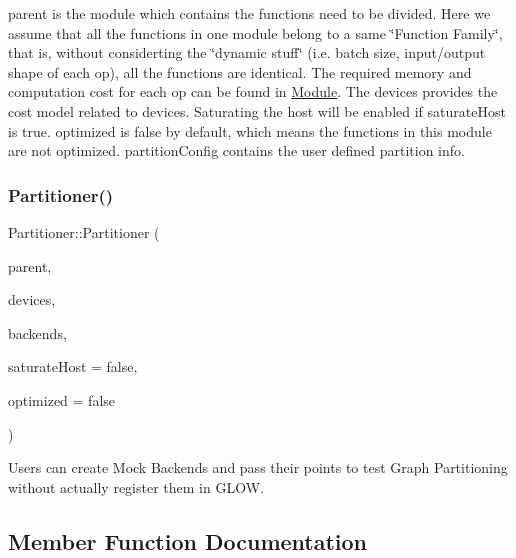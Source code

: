 {\ttfamily parent} is the module which contains the functions need to be divided. Here we assume that all the functions in one module belong to a same \char`\"{}\+Function Family\char`\"{}, that is, without considerting the \char`\"{}dynamic stuff\char`\"{} (i.\+e. batch size, input/output shape of each op), all the functions are identical. The required memory and computation cost for each op can be found in \hyperlink{classglow_1_1_module}{Module}. The {\ttfamily devices} provides the cost model related to devices. Saturating the host will be enabled if {\ttfamily saturate\+Host} is true. {\ttfamily optimized} is false by default, which means the functions in this module are not optimized. {\ttfamily partition\+Config} contains the user defined partition info. \mbox{\label{classglow_1_1_partitioner_a7de345d695b595b2ade385ee1cd82644}} 
\subsubsection{\texorpdfstring{Partitioner()}{Partitioner()}\hspace{0.1cm}{\footnotesize\ttfamily [2/2]}}
{\footnotesize\ttfamily Partitioner\+::\+Partitioner (\begin{DoxyParamCaption}\item[{\hyperlink{classglow_1_1_module}{Module} $\ast$}]{parent,  }\item[{const std\+::vector$<$ \hyperlink{structglow_1_1runtime_1_1_device_info}{Device\+Info} $>$ \&}]{devices,  }\item[{const std\+::vector$<$ \hyperlink{classglow_1_1_backend}{Backend} $\ast$$>$ \&}]{backends,  }\item[{bool}]{saturate\+Host = {\ttfamily false},  }\item[{bool}]{optimized = {\ttfamily false} }\end{DoxyParamCaption})}

Users can create Mock Backends and pass their points to test Graph Partitioning without actually register them in G\+L\+OW. 

\subsection{Member Function Documentation}
\mbox{\label{classglow_1_1_partitioner_adb733cf9c471edeb7cac89224c403368}} 
